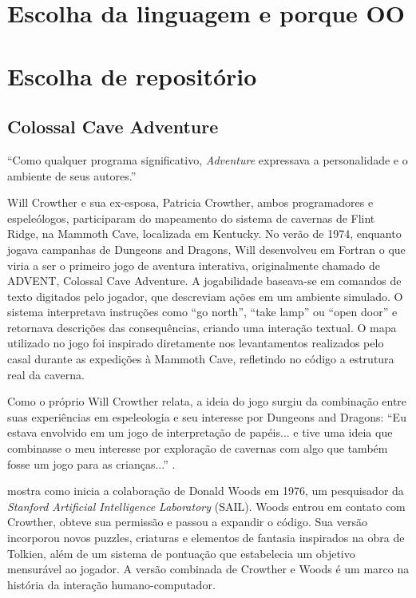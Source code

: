 \documentclass[12pt,a4paper]{article}
\begin{document}
\section{Escolha da linguagem e porque OO}
\section{Escolha de repositório}
\subsection{Colossal Cave Adventure}
“Como qualquer programa significativo, \textit{Adventure} expressava a personalidade e o ambiente de seus autores.” \textcite{levy2010hackers}

Will Crowther e sua ex-esposa, Patricia Crowther, ambos programadores e espeleólogos, participaram do mapeamento do sistema de cavernas de Flint Ridge, na Mammoth Cave, localizada em Kentucky. No verão de 1974, enquanto jogava campanhas de Dungeons and Dragons, Will desenvolveu em Fortran o que viria a ser o primeiro jogo de aventura interativa, originalmente chamado de ADVENT, Colossal Cave Adventure. A jogabilidade baseava-se em comandos de texto digitados pelo jogador, que descreviam ações em um ambiente simulado. O sistema interpretava instruções como “go north”, “take lamp” ou “open door” e retornava descrições das consequências, criando uma interação textual. O mapa utilizado no jogo foi inspirado diretamente nos levantamentos realizados pelo casal durante as expedições à Mammoth Cave, refletindo no código a estrutura real da caverna.

Como o próprio Will Crowther relata, a ideia do jogo surgiu da combinação entre suas experiências em espeleologia e seu interesse por Dungeons and Dragons: “Eu estava envolvido em um jogo de interpretação de papéis... e tive uma ideia que combinasse o meu interesse por exploração de cavernas com algo que também fosse um jogo para as crianças...” \textcite{peterson1983genesis}.

\textcite{levy2010hackers} mostra como inicia a colaboração de Donald Woods em 1976, um pesquisador da \textit{Stanford Artificial Intelligence Laboratory} (SAIL). Woods entrou em contato com Crowther, obteve sua permissão e passou a expandir o código. Sua versão incorporou novos puzzles, criaturas e elementos de fantasia inspirados na obra de Tolkien, além de um sistema de pontuação que estabelecia um objetivo mensurável ao jogador. A versão combinada de Crowther e Woods é um marco na história da interação humano-computador.
\end{document}
